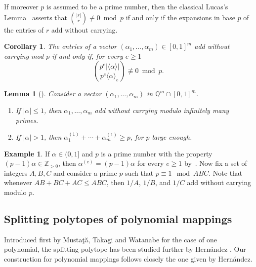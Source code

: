 \documentclass[12pt]{amsart}
\newtheorem{corollary}[theorem]{Corollary}
\newtheorem{lemma}[theorem]{Lemma}
\theoremstyle{definition}
\newtheorem{example}[theorem]{Example}
\numberwithin{equation}{subsection}
\newcommand{\ZZ}{\mathbb{Z}}
\newcommand{\QQ}{\mathbb{Q}}
\renewcommand{\!}[1]{{\color{red}\text{\Huge$\star$ }#1}}
\begin{document}
If moreover $p$ is assumed to be a prime number, then the classical Lucas's Lemma~\cite{Lucas} asserts that $\binom{|r|}{r}\not \equiv 0 \bmod p$ if and only if the expansions in base $p$ of the entries of $r$ add without carrying.
\begin{corollary}\label{Cor:adding wo carrying}
	The entries of a vector $(\alpha_1,\ldots,\alpha_m)\in[0,1]^m$ add without carrying mod $p$ if and only if, for every $e\geq 1$
	\[\binom{p^e |\langle\alpha\rangle|}{p^e \langle\alpha\rangle_e}  \not \equiv 0 \bmod p.
	\]
\end{corollary}
\begin{lemma}[{\cite[Lemma 8]{HDpolynomials}}]\label{lema:lemma8}
	Consider a vector $(\alpha_1,\ldots,\alpha_m)$ in $\QQ^m\cap [0,1]^m$.
	\begin{enumerate}
		\item If $|\alpha|\leq 1$, then $\alpha_1,\ldots,\alpha_m$ add without carrying modulo infinitely many primes.
		\item If $|\alpha|> 1$, then $\alpha_1^{(1)}+\cdots+\alpha_m^{(1)} \geq p$, for $p$ large enough.
	\end{enumerate}
\end{lemma}
\begin{example}\label{Ex:pExpansion}
	If $\alpha\in (0,1]$ and $p$ is a prime number with the property $(p-1)\alpha\in \ZZ_{> 0}$, then $\alpha^{(e)}=(p - 1)\alpha$ for every $e\geq 1$ by~\cite[Lemma 4]{HDpolynomials}. Now fix a set of integers $A,B,C$ and consider a prime $p$ such that $p \equiv 1 \mod ABC$. Note that whenever $AB+BC+AC\leq ABC$, then $1/A$, $1/B$, and $1/C$ add without carrying modulo $p$.
\end{example}

\subsection{Splitting polytopes of polynomial mappings}\label{Ssec:Spli Pol}
Introduced first by Musta{\c{t}}{\u{a}}, Takagi and Watanabe \cite{MTW} for the case of one polynomial, the splitting polytope has been studied further by Hern\'andez \cite{HDbinomial,HDpolynomials}. Our construction for polynomial mappings follows closely the one given by Hern\'andez.
\end{document}
